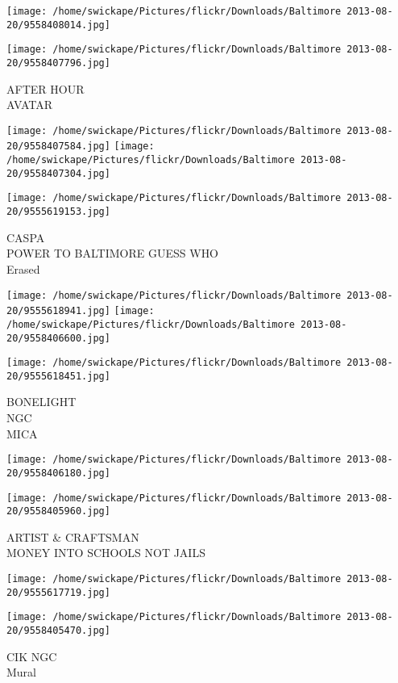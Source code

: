 \documentclass[10pt,letterpaper]{article}
\begin{document}
\texttt{[image: /home/swickape/Pictures/flickr/Downloads/Baltimore 2013-08-20/9558408014.jpg]}

\vspace{0.25in}
\texttt{[image: /home/swickape/Pictures/flickr/Downloads/Baltimore 2013-08-20/9558407796.jpg]}

AFTER HOUR\\
AVATAR
\pagebreak

\texttt{[image: /home/swickape/Pictures/flickr/Downloads/Baltimore 2013-08-20/9558407584.jpg]}
\texttt{[image: /home/swickape/Pictures/flickr/Downloads/Baltimore 2013-08-20/9558407304.jpg]}

\vspace{0.25in}
\texttt{[image: /home/swickape/Pictures/flickr/Downloads/Baltimore 2013-08-20/9555619153.jpg]}

CASPA\\
POWER TO BALTIMORE GUESS WHO\\
Erased
\pagebreak

\texttt{[image: /home/swickape/Pictures/flickr/Downloads/Baltimore 2013-08-20/9555618941.jpg]}
\texttt{[image: /home/swickape/Pictures/flickr/Downloads/Baltimore 2013-08-20/9558406600.jpg]}

\texttt{[image: /home/swickape/Pictures/flickr/Downloads/Baltimore 2013-08-20/9555618451.jpg]}

BONELIGHT\\
NGC\\
MICA
\pagebreak

\texttt{[image: /home/swickape/Pictures/flickr/Downloads/Baltimore 2013-08-20/9558406180.jpg]}

\vspace{0.25in}
\texttt{[image: /home/swickape/Pictures/flickr/Downloads/Baltimore 2013-08-20/9558405960.jpg]}

ARTIST \& CRAFTSMAN\\
MONEY INTO SCHOOLS NOT JAILS
\pagebreak

\texttt{[image: /home/swickape/Pictures/flickr/Downloads/Baltimore 2013-08-20/9555617719.jpg]}

\vspace{0.25in}
\texttt{[image: /home/swickape/Pictures/flickr/Downloads/Baltimore 2013-08-20/9558405470.jpg]}

CIK NGC\\
Mural
\pagebreak
\end{document}
